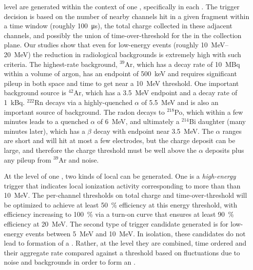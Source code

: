  level  are generated within
the context of one , specifically in each . 
The trigger decision is based on the number of nearby channels
hit in a given fragment within a time window (roughly \SI{100}{\micro\s}),
the total charge collected in these adjacent channels, and possibly the
union of time-over-threshold for the  in the
collection plane.
Our studies show that even for low-energy events (roughly
\SIrange{10}{20}{\MeV}) the reduction in radiological backgrounds is
extremely high with such criteria.
The highest-rate background, $^{39}$Ar, which has a decay rate of
\SI{10}{MBq} within a \nominalmodsize volume of argon, has an endpoint 
of \SI{500}{keV} and requires significant pileup in both space and time to get near
a \SI{10}{\MeV} threshold.
One important background source is $^{42}$Ar, which has a \SI{3.5}{MeV}
endpoint and a decay rate of \SI{1}{kBq}. 
$^{222}$Rn decays via a highly-quenched $\alpha$ of \SI{5.5}{MeV} and is
also an important source of background.
The radon decays to $^{218}$Po, which within a few minutes leads to a
quenched $\alpha$ of \SI{6}{MeV}, and ultimately a $^{214}$Bi daughter (many
minutes later), which has a $\beta$ decay with endpoint near \SI{3.5}{MeV}. 
The $\alpha$ ranges are short and will hit at most a few electrodes,
but the charge deposit can be large, and therefore the charge
threshold must be well above the $\alpha$ deposits plus any
pileup from $^{39}$Ar and noise.

At the level of one , two kinds of local
 can be generated.
One is a \textit{high-energy} trigger that indicates local ionization
activity corresponding to more than than \SI{10}{\MeV}. %
The per-channel thresholds on total charge and time-over-threshold
will be optimized to achieve at least \SI{50}{\%} efficiency at this energy
threshold, with efficiency increasing to \SI{100}{\%} via a turn-on curve
that ensures at least \SI{90}{\%} efficiency at \SI{20}{\MeV}. 
The second type of trigger candidate %
generated is for
low-energy events between \SI{5}{\MeV} and \SI{10}{\MeV}. 
In isolation, these candidates do not lead to formation of a
. 
Rather, at the  level they are combined, time
ordered and their aggregate rate compared against a threshold based on
fluctuations due to noise and backgrounds in order to form an
 .

